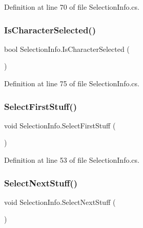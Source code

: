 Definition at line 70 of file Selection\+Info.\+cs.

\mbox{\label{class_selection_info_ad0fa265814f54128149cf7fa09fbdef3}} 
\subsubsection{\texorpdfstring{Is\+Character\+Selected()}{IsCharacterSelected()}}
{\footnotesize\ttfamily bool Selection\+Info.\+Is\+Character\+Selected (\begin{DoxyParamCaption}{ }\end{DoxyParamCaption})}



Definition at line 75 of file Selection\+Info.\+cs.

\mbox{\label{class_selection_info_ab8d67c80ab119f1363469558cd4b1a67}} 
\subsubsection{\texorpdfstring{Select\+First\+Stuff()}{SelectFirstStuff()}}
{\footnotesize\ttfamily void Selection\+Info.\+Select\+First\+Stuff (\begin{DoxyParamCaption}{ }\end{DoxyParamCaption})}



Definition at line 53 of file Selection\+Info.\+cs.

\mbox{\label{class_selection_info_ae8b10bdd6bacc96de5d35363ea1f15dd}} 
\subsubsection{\texorpdfstring{Select\+Next\+Stuff()}{SelectNextStuff()}}
{\footnotesize\ttfamily void Selection\+Info.\+Select\+Next\+Stuff (\begin{DoxyParamCaption}{ }\end{DoxyParamCaption})}



